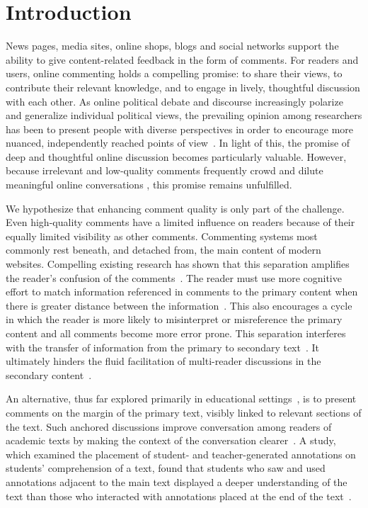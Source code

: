\section{Introduction}

News pages, media sites, online shops, blogs and social networks support the ability to give content-related feedback in the form of comments. For readers and users, online commenting holds a compelling promise: to share their views, to contribute their relevant knowledge, and to engage in lively, thoughtful discussion with each other. As online political debate and discourse increasingly polarize and generalize individual political views, the prevailing opinion among researchers has been to present people with diverse perspectives in order to encourage more nuanced, independently reached points of view~\cite{ConsiderIt,Politics,NewsCube}. In light of this, the promise of deep and thoughtful online discussion becomes particularly valuable. However, because irrelevant and low-quality comments frequently crowd and dilute meaningful online conversations \cite{CommentQuality, FlamingCommunications}, this promise remains unfulfilled.

We hypothesize that enhancing comment quality is only part of the challenge. Even high-quality comments have a limited influence on readers because of their equally limited visibility as other comments. Commenting systems most commonly rest beneath, and detached from, the main content of modern websites. Compelling existing research has shown that this separation amplifies the reader's confusion of the comments~\cite{NewsInterfaces}. The reader must use more cognitive effort to match information referenced in comments to the primary content when there is greater distance between the information~\cite{FluidDocs}. This also encourages a cycle in which the reader is more likely to misinterpret or misreference the primary content and all comments become more error prone. This separation interferes with the transfer of information from the primary to secondary text~\cite{Brush,Guzdial,van}. It ultimately hinders the fluid facilitation of multi-reader discussions in the secondary content~\cite{AnnotationsStudents,NB}.

An alternative, thus far explored primarily in educational settings~\cite{Brush,Guzdial,van,AnnotationsStudents}, is to present comments on the margin of the primary text, visibly linked to relevant sections of the text. Such anchored discussions improve conversation among readers of academic texts by making the context of the conversation clearer~\cite{Brush,Guzdial,van}. A study, which examined the placement of student- and teacher-generated annotations on students' comprehension of a text, found that students who saw and used annotations adjacent to the main text displayed a deeper understanding of the text than those who interacted with annotations placed at the end of the text~\cite{AnnotationsStudents}.


